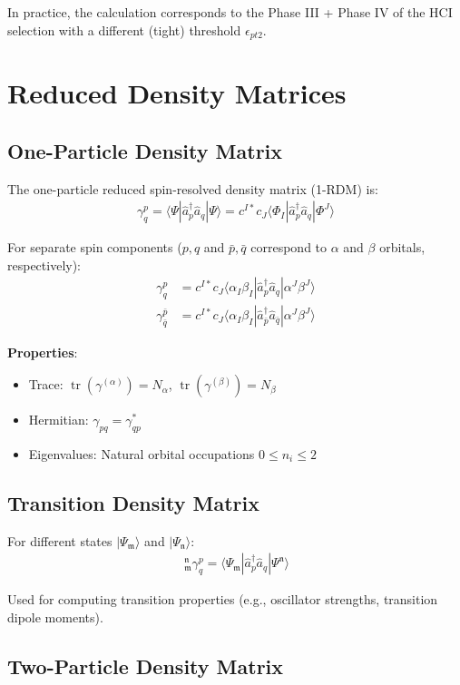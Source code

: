 \documentclass[a4paper,12pt,oneside]{book}
\newcommand{\beq}{\begin{equation}\begin{aligned}}
\newcommand{\eeq}{\end{aligned}\end{equation}}
\newcommand{\op}{\hat}
\DeclareMathOperator{\trace}{tr}
\newcommand{\spa}[1]{{#1}}
\newcommand{\spb}[1]{\bar{#1}}
\newcommand{\st}[1]{\mathfrak{#1}}
\newcommand{\pre}[1]{\,#1\!}
\begin{document}
In practice, the calculation corresponds to the Phase III + Phase IV of the HCI selection
with a different (tight) threshold $\epsilon_{pt2}$.

\section{Reduced Density Matrices}
\label{sec:rdm}

\subsection{One-Particle Density Matrix}

The one-particle reduced spin-resolved density matrix (1-RDM) is:
\beq
\gamma^p_{q} = \langle \Psi | \op{a}^\dagger_p \op{a}_q | \Psi \rangle
            = c^{I*} c_J \langle \Phi_I | \op{a}^\dagger_p \op{a}_q | \Phi^J \rangle
\eeq

For separate spin components ($\spa{p},\spa{q}$ and $\spb{p},\spb{q}$ correspond 
to $\alpha$ and $\beta$ orbitals, respectively):
\beq
\gamma^{\spa{p}}_{\spa{q}} &= c^{I*} c_J \langle \alpha_I \beta_I | 
    \op{a}^\dagger_{\spa{p}} \op{a}_{\spa{q}} | \alpha^J \beta^J \rangle \\
\gamma^{\spb{p}}_{\spb{q}} &= c^{I*} c_J \langle \alpha_I \beta_I | 
    \op{a}^\dagger_{\spb{p}} \op{a}_{\spb{q}} | \alpha^J \beta^J \rangle
\eeq

\textbf{Properties}:
\begin{itemize}
\item Trace: $\trace(\gamma^{(\alpha)}) = N_{\alpha}$, $\trace(\gamma^{(\beta)}) = N_{\beta}$
\item Hermitian: $\gamma_{pq} = \gamma_{qp}^*$
\item Eigenvalues: Natural orbital occupations $0 \leq n_i \leq 2$
\end{itemize}

\subsection{Transition Density Matrix}

For different states $|\Psi_\st{m}\rangle$ and $|\Psi_\st{n}\rangle$:
\beq
\pre{_\st{m}^\st{n}}\gamma^p_{q} = \langle \Psi_\st{m} | \op{a}^\dagger_p \op{a}_q | \Psi^\st{n} \rangle
\eeq

Used for computing transition properties (e.g., oscillator strengths, transition dipole moments).

\subsection{Two-Particle Density Matrix}
\end{document}
